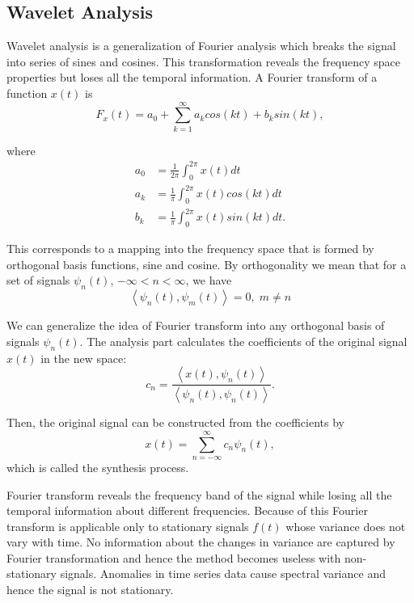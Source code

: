 \subsection{Wavelet Analysis}
Wavelet analysis is a generalization of Fourier analysis which breaks the signal into series of sines and cosines. This transformation reveals the frequency space properties but loses all the temporal information. \cite{Fong04} A Fourier transform of a function $x(t)$ is 
\begin{equation}
F_{x}(t) = a_0 + \sum_{k=1}^{\infty} a_k cos(kt) + b_k sin(kt),
\end{equation}

where
\begin{align}
a_0 &= \frac{1}{2\pi} \int_{0}^{2\pi} x(t) dt \\
a_k &= \frac{1}{\pi} \int_{0}^{2\pi} x(t) cos(kt) dt \\
b_k &= \frac{1}{\pi} \int_{0}^{2\pi} x(t) sin(kt) dt.
\end{align}

This corresponds to a mapping into the frequency space that is formed by orthogonal basis functions, sine and cosine. By orthogonality we mean that for a set of signals $\psi_n(t)$, $-\infty < n < \infty$, we have
\begin{equation}
\left \langle \psi_n(t), \psi_m(t) \right \rangle = 0, \; m \ne n
\end{equation}

We can generalize the idea of Fourier transform into any orthogonal basis of signals $\psi_n(t)$. The analysis part calculates the coefficients of the original signal $x(t)$ in the new space:
\begin{equation}
c_n = \frac{\left \langle x(t), \psi_n(t) \right \rangle}{\left \langle \psi_n(t), \psi_n(t) \right \rangle}.
\end{equation}

Then, the original signal can be constructed from the coefficients by
\begin{equation}
x(t) = \sum_{n=-\infty}^{\infty} c_n \psi_n(t),
\end{equation}
which is called the synthesis process.

Fourier transform reveals the frequency band of the signal while losing all the temporal information about different frequencies. \cite{Fong04} Because of this Fourier transform is applicable only to stationary signals $f(t)$ whose variance does not vary with time. No information about the changes in variance are captured by Fourier transformation and hence the method becomes useless with non-stationary signals. Anomalies in time series data cause spectral variance and hence the signal is not stationary. \cite{Hautakangas11} 

